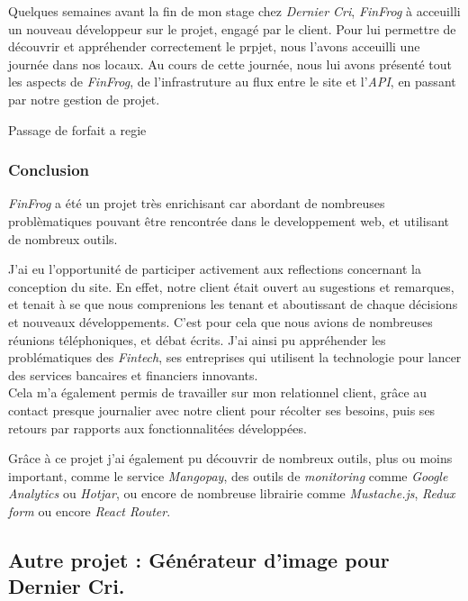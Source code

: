 Quelques semaines avant la fin de mon stage chez \emph{Dernier Cri},
\emph{FinFrog} à acceuilli un nouveau développeur sur le projet, engagé
par le client. Pour lui permettre de découvrir et appréhender
correctement le prpjet, nous l'avons acceuilli une journée dans nos
locaux. Au cours de cette journée, nous lui avons présenté tout les
aspects de \emph{FinFrog}, de l'infrastruture au flux entre le site et
l'\emph{API}, en passant par notre gestion de projet.

\bigskip

Passage de forfait a regie

\subsubsection{Conclusion}\label{conclusion-1}

\emph{FinFrog} a été un projet très enrichisant car abordant de
nombreuses problèmatiques pouvant être rencontrée dans le developpement
web, et utilisant de nombreux outils.

\bigskip

J'ai eu l'opportunité de participer activement aux reflections
concernant la conception du site. En effet, notre client était ouvert au
sugestions et remarques, et tenait à se que nous comprenions les tenant
et aboutissant de chaque décisions et nouveaux développements. C'est
pour cela que nous avions de nombreuses réunions téléphoniques, et débat
écrits. J'ai ainsi pu appréhender les problématiques des \emph{Fintech},
ses entreprises qui utilisent la technologie pour lancer des services
bancaires et financiers innovants.\\
Cela m'a également permis de travailler sur mon relationnel client,
grâce au contact presque journalier avec notre client pour récolter ses
besoins, puis ses retours par rapports aux fonctionnalitées développées.

\bigskip

Grâce à ce projet j'ai également pu découvrir de nombreux outils, plus
ou moins important, comme le service \emph{Mangopay}, des outils de
\emph{monitoring} comme \emph{Google Analytics} ou \emph{Hotjar}, ou
encore de nombreuse librairie comme \emph{Mustache.js}, \emph{Redux
form} ou encore \emph{React Router}.

\bigskip

\subsection{Autre projet : Générateur d'image pour Dernier
Cri.}\label{autre-projet-guxe9nuxe9rateur-dimage-pour-dernier-cri.}

